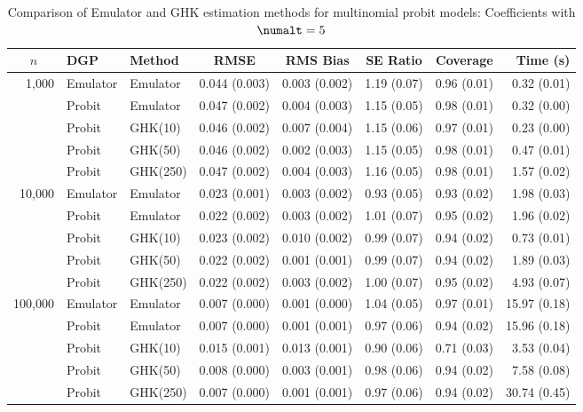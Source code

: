 \begin{table}[htbp]
\centering
\footnotesize
\begin{tabular}{@{}rllrrrrr@{}}
\toprule
\multicolumn{1}{c}{$n$} & \multicolumn{1}{l}{DGP} & \multicolumn{1}{l}{Method} & \multicolumn{1}{c}{RMSE} & \multicolumn{1}{c}{RMS Bias} & \multicolumn{1}{c}{SE Ratio} & \multicolumn{1}{c}{Coverage} & \multicolumn{1}{r}{Time (s)} \\
\midrule
\multirow{5}{*}{1,000} & Emulator & Emulator & 0.044 (0.003) & 0.003 (0.002) & 1.19 (0.07) & 0.96 (0.01) & 0.32 (0.01) \\
 & Probit & Emulator & 0.047 (0.002) & 0.004 (0.003) & 1.15 (0.05) & 0.98 (0.01) & 0.32 (0.00) \\
 & Probit & GHK(10) & 0.046 (0.002) & 0.007 (0.004) & 1.15 (0.06) & 0.97 (0.01) & 0.23 (0.00) \\
 & Probit & GHK(50) & 0.046 (0.002) & 0.002 (0.003) & 1.15 (0.05) & 0.98 (0.01) & 0.47 (0.01) \\
 & Probit & GHK(250) & 0.047 (0.002) & 0.004 (0.003) & 1.16 (0.05) & 0.98 (0.01) & 1.57 (0.02) \\
\midrule
\multirow{5}{*}{10,000} & Emulator & Emulator & 0.023 (0.001) & 0.003 (0.002) & 0.93 (0.05) & 0.93 (0.02) & 1.98 (0.03) \\
 & Probit & Emulator & 0.022 (0.002) & 0.003 (0.002) & 1.01 (0.07) & 0.95 (0.02) & 1.96 (0.02) \\
 & Probit & GHK(10) & 0.023 (0.002) & 0.010 (0.002) & 0.99 (0.07) & 0.94 (0.02) & 0.73 (0.01) \\
 & Probit & GHK(50) & 0.022 (0.002) & 0.001 (0.001) & 0.99 (0.07) & 0.94 (0.02) & 1.89 (0.03) \\
 & Probit & GHK(250) & 0.022 (0.002) & 0.003 (0.002) & 1.00 (0.07) & 0.95 (0.02) & 4.93 (0.07) \\
\midrule
\multirow{5}{*}{100,000} & Emulator & Emulator & 0.007 (0.000) & 0.001 (0.000) & 1.04 (0.05) & 0.97 (0.01) & 15.97 (0.18) \\
 & Probit & Emulator & 0.007 (0.000) & 0.001 (0.001) & 0.97 (0.06) & 0.94 (0.02) & 15.96 (0.18) \\
 & Probit & GHK(10) & 0.015 (0.001) & 0.013 (0.001) & 0.90 (0.06) & 0.71 (0.03) & 3.53 (0.04) \\
 & Probit & GHK(50) & 0.008 (0.000) & 0.003 (0.001) & 0.98 (0.06) & 0.94 (0.02) & 7.58 (0.08) \\
 & Probit & GHK(250) & 0.007 (0.000) & 0.001 (0.001) & 0.97 (0.06) & 0.94 (0.02) & 30.74 (0.45) \\
\bottomrule
\end{tabular}
\caption{Comparison of Emulator and GHK estimation methods for multinomial probit models: Coefficients with $\numalt=5$}
\label{tab:emulator_vs_ghk:5:beta}
\end{table}